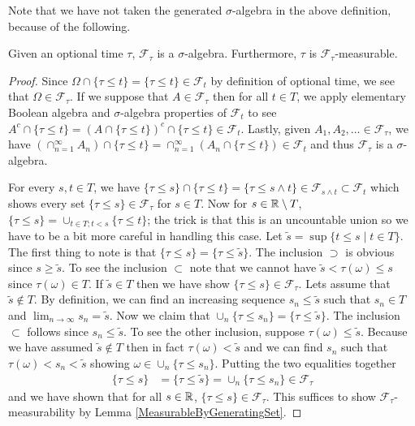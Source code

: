  Note that we have not taken the generated $\sigma$-algebra in the
above definition, because of the following.
\begin{lem}\label{StoppedFiltration}Given an optional time $\tau$, $\mathcal{F}_\tau$ is a
  $\sigma$-algebra.  Furthermore, $\tau$ is $\mathcal{F}_\tau$-measurable.
\end{lem}
\begin{proof}Since $\Omega \cap \lbrace \tau \leq t \rbrace  = \lbrace
  \tau \leq t \rbrace \in \mathcal{F}_t$ by definition of optional
  time, we see that $\Omega \in \mathcal{F}_\tau$.  If we suppose that
  $A \in \mathcal{F}_\tau$ then for all $t \in T$, we apply elementary
  Boolean  algebra and $\sigma$-algebra properties of $\mathcal{F}_t$ to see $A^c \cap \lbrace
  \tau \leq t \rbrace = (A \cap \lbrace
  \tau \leq t \rbrace)^c \cap \lbrace
  \tau \leq t \rbrace \in \mathcal{F}_t$.  Lastly, given $A_1, A_2,
  \dots \in \mathcal{F}_\tau$, we have $(\cap_{n=1}^\infty A_n)
  \cap \lbrace
  \tau \leq t \rbrace = \cap_{n=1}^\infty (A_n
  \cap \lbrace
  \tau \leq t \rbrace ) \in \mathcal{F}_t$ and thus $\mathcal{F}_\tau$
  is a $\sigma$-algebra.

For every $s,t \in T$, we have 
$\lbrace \tau \leq s \rbrace \cap \lbrace \tau \leq t \rbrace =
\lbrace \tau \leq s \wedge t \rbrace \in \mathcal{F}_{s \wedge t}
\subset \mathcal{F}_t$ which shows every set $\lbrace \tau \leq s
\rbrace \in \mathcal{F}_\tau$ for $s \in T$.  Now for $s \in \mathbb{R}
\setminus T$,
$\lbrace \tau \leq s \rbrace = \cup_{t \in T ; t < s} \lbrace \tau
\leq t \rbrace$; the trick is that this is an uncountable
union so we have to be a bit more careful in handling this
case.  Let $\tilde{s} = \sup \lbrace t \leq s \mid t \in T \rbrace$.  The
first thing to note is that $\lbrace \tau \leq s \rbrace = \lbrace
\tau \leq \tilde{s} \rbrace$.  The inclusion $\supset$ is obvious
since $s \geq \tilde{s}$.  To see the inclusion $\subset$ note that we
cannot have $\tilde{s} < \tau(\omega) \leq s$ since $\tau(\omega) \in
T$.  If $\tilde{s} \in T$ then we have show $\lbrace \tau \leq s
\rbrace \in \mathcal{F}_\tau$.  Lets assume that $\tilde{s} \notin T$.
By definition, we can find an increasing sequence $s_n \leq \tilde{s}$
such that $s_n \in T$ and $\lim_{n
  \to \infty} s_n = \tilde{s}$.  Now we claim that $\cup_n \lbrace \tau \leq
s_n \rbrace = \lbrace \tau \leq \tilde{s} \rbrace$.  The inclusion
$\subset$ follows since $s_n \leq \tilde{s}$.  To see the other
inclusion, suppose $\tau(\omega) \leq \tilde{s}$.  Because we have
assumed $\tilde{s} \notin T$ then in fact $\tau(\omega) < \tilde{s}$
and we can find $s_n$ such that $\tau(\omega) < s_n < \tilde{s}$
showing $\omega \in \cup_n \lbrace \tau \leq
s_n \rbrace$.  Putting the two equalities together
\begin{align*}
\lbrace \tau \leq s \rbrace &= \lbrace \tau \leq \tilde{s} \rbrace =
\cup_n \lbrace \tau \leq s_n \rbrace \in \mathcal{F}_\tau
\end{align*}
and we have shown that for all $s \in \mathbb{R}$, $\lbrace \tau \leq s
\rbrace \in \mathcal{F}_\tau$.
This suffices to show $\mathcal{F}_\tau$-measurability by Lemma \ref{MeasurableByGeneratingSet}.
\end{proof}

